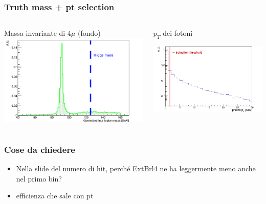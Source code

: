 \documentclass{beamer}
\begin{document}
\begin{frame}
\frametitle{Truth mass + pt selection}
\begin{columns}
\begin{column}{.5\textwidth}
\centering
Massa invariante di $4\mu$ (fondo)
\includegraphics[width=\textwidth]{ZZ4mu/gen4muMass4}
\end{column}
\begin{column}{.5\textwidth}
\centering
$p_{T}$ dei fotoni\par
\includegraphics[width=\textwidth]{HZZ4mu/photonPt4}
\end{column}
\end{columns}
\end{frame}

\begin{frame}
\frametitle{Cose da chiedere}
\begin{itemize}
\item Nella slide del numero di hit, perché ExtBrl4 ne ha leggermente meno anche nel primo bin?
\item efficienza che sale con pt
\end{itemize}
\end{frame}
\end{document}
